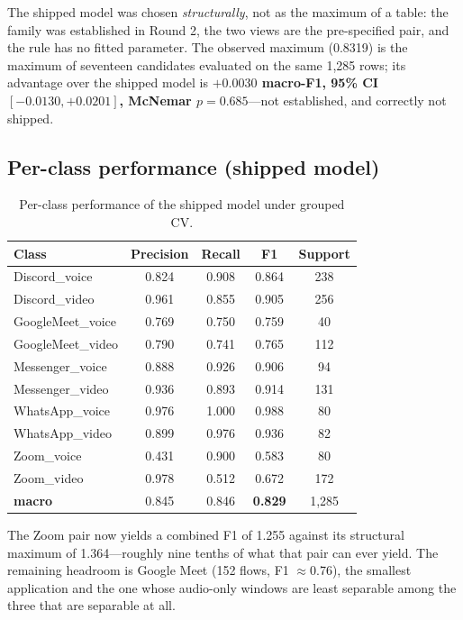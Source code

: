 \documentclass[11pt]{article}
\begin{document}
The shipped model was chosen \emph{structurally}, not as the maximum of a table: the family was established
in Round 2, the two views are the pre-specified pair, and the rule has no fitted parameter. The observed
maximum (0.8319) is the maximum of seventeen candidates evaluated on the same 1{,}285 rows; its advantage
over the shipped model is \textbf{$+0.0030$ macro-F1, 95\% CI $[-0.0130, +0.0201]$, McNemar $p = 0.685$}---not
established, and correctly not shipped.

\subsection{Per-class performance (shipped model)}

\begin{table}[htbp]
\centering\small
\caption{Per-class performance of the shipped model under grouped CV.}
\label{tab:perclass}
\begin{tabular}{lcccc}
\toprule
Class & Precision & Recall & F1 & Support \\
\midrule
Discord\_voice & 0.824 & 0.908 & 0.864 & 238 \\
Discord\_video & 0.961 & 0.855 & 0.905 & 256 \\
GoogleMeet\_voice & 0.769 & 0.750 & 0.759 & 40 \\
GoogleMeet\_video & 0.790 & 0.741 & 0.765 & 112 \\
Messenger\_voice & 0.888 & 0.926 & 0.906 & 94 \\
Messenger\_video & 0.936 & 0.893 & 0.914 & 131 \\
WhatsApp\_voice & 0.976 & 1.000 & 0.988 & 80 \\
WhatsApp\_video & 0.899 & 0.976 & 0.936 & 82 \\
Zoom\_voice & 0.431 & 0.900 & 0.583 & 80 \\
Zoom\_video & 0.978 & 0.512 & 0.672 & 172 \\
\midrule
\textbf{macro} & 0.845 & 0.846 & \textbf{0.829} & 1{,}285 \\
\bottomrule
\end{tabular}
\end{table}

The Zoom pair now yields a combined F1 of 1.255 against its structural maximum of 1.364---roughly nine
tenths of what that pair can ever yield. The remaining headroom is Google Meet (152 flows, F1 $\approx$0.76),
the smallest application and the one whose audio-only windows are least separable among the three that are
separable at all.
\end{document}
